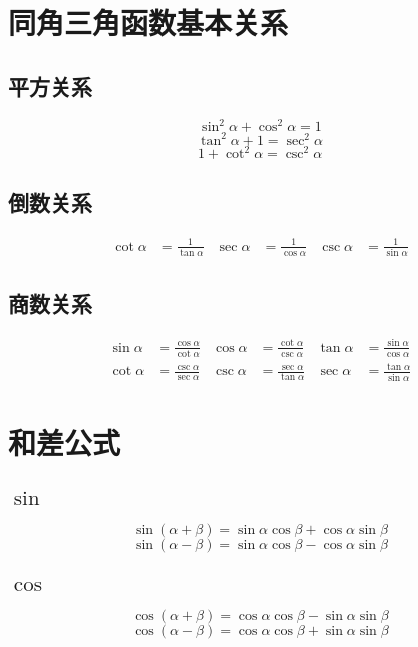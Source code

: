 \documentclass[a4paper, fleqn, fontset = mac]{ctexart}
\newcommand{\diform}{\noindent}
\begin{document}
\begin{multicols}{2}
\begin{multicols}{2}[\setlength{\columnseprule}{0pt}\setlength{\columnseprule}{0pt}]
	\end{multicols}

	\section{同角三角函数基本关系}

	\subsection{平方关系}
	\diform
	\[\sin^2\alpha+\cos^2\alpha=1\]
	\[\tan^2\alpha+1=\sec^2\alpha\]
	\[1+\cot^2\alpha=\csc^2\alpha\]

	\subsection{倒数关系}
	\diform
	
	
	\begin{align*}
	\cot\alpha&=\frac1{\tan\alpha} &
	\sec\alpha&=\frac1{\cos\alpha} &
	\csc\alpha&=\frac1{\sin\alpha} 
	\end{align*}

	\subsection{商数关系}
	\diform
	\begin{align*}
		\sin\alpha&=\frac{\cos\alpha}{\cot\alpha} &
		\cos\alpha&=\frac{\cot\alpha}{\csc\alpha} &
		\tan\alpha&=\frac{\sin\alpha}{\cos\alpha} \\
		\cot\alpha&=\frac{\csc\alpha}{\sec\alpha} &
		\csc\alpha&=\frac{\sec\alpha}{\tan\alpha} &
		\sec\alpha&=\frac{\tan\alpha}{\sin\alpha} 
	\end{align*}

	\section{和差公式}
	\subsection{$\sin$}
	\diform
	\[ \sin\left( \alpha+\beta \right) 
	= \sin\alpha\cos\beta + \cos\alpha\sin\beta \]
	\[ \sin\left( \alpha-\beta \right) 
	= \sin\alpha\cos\beta - \cos\alpha\sin\beta \]
	
	\subsection{$\cos$}
	\diform
	\[ \cos\left( \alpha + \beta \right) =
	\cos\alpha\cos\beta - \sin\alpha\sin\beta \]
	\[ \cos\left( \alpha - \beta \right) =
	\cos\alpha\cos\beta + \sin\alpha\sin\beta \] 


\end{multicols}
\end{document}
